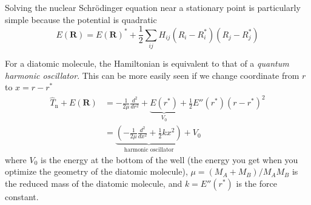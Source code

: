 \documentclass[../Main/notes.tex]{subfiles}
\begin{document}
Solving  the nuclear Schr\"{o}dinger equation near a stationary point is particularly simple because the potential is quadratic
\begin{equation}
E(\mathbf{R}) =
E(\mathbf{R})^*
+\frac{1}{2}
\sum_{ij} H_{ij} (R_i - R_i^*) (R_j - R_j^*) 
\end{equation}

For a diatomic molecule, the Hamiltonian is equivalent to that of a \emph{quantum harmonic oscillator}.
This can be more easily seen if we change coordinate from $r$ to $x = r - r^*$ 
\begin{equation}
\begin{split}
\hat{T}_\mathrm{n} + E(\mathbf{R}) & = -\frac{1}{2 \mu} \frac{d^2}{dr^2} + 
 \underbrace{E(r^*)}_{V_0} + \frac{1}{2} E''(r^*) (r - r^*)^2 \\
 & = \underbrace{\left( -\frac{1}{2 \mu} \frac{d^2}{dx^2} 
+ \frac{1}{2} k x^2 \right)}_{\text{harmonic oscillator}} + V_0
\end{split}
\end{equation}
where $V_0$ is the energy at the bottom of the well (the energy you get when you optimize the geometry of the diatomic molecule), $\mu = (M_A + M_B) / M_A M_B$ is the reduced mass of the diatomic molecule, and $k = E''(r^*)$ is the force constant.

\end{document}
